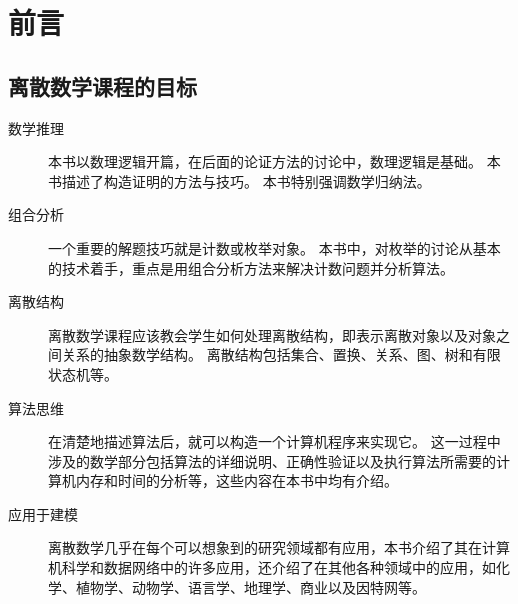 \chapter{前言}
{
    \section{离散数学课程的目标}
    {
        \begin{description}
            \item[数学推理]
            {
                本书以数理逻辑开篇，在后面的论证方法的讨论中，数理逻辑是基础。
                本书描述了构造证明的方法与技巧。
                本书特别强调数学归纳法。
            }
            \item[组合分析]
            {
                一个重要的解题技巧就是计数或枚举对象。
                本书中，对枚举的讨论从基本的技术着手，重点是用组合分析方法来解决计数问题并分析算法。
            }
            \item[离散结构]
            {
                离散数学课程应该教会学生如何处理离散结构，即表示离散对象以及对象之间关系的抽象数学结构。
                离散结构包括集合、置换、关系、图、树和有限状态机等。
            }
            \item[算法思维]
            {
                在清楚地描述算法后，就可以构造一个计算机程序来实现它。
                这一过程中涉及的数学部分包括算法的详细说明、正确性验证以及执行算法所需要的计算机内存和时间的分析等，这些内容在本书中均有介绍。
            }
            \item[应用于建模]
            {
                离散数学几乎在每个可以想象到的研究领域都有应用，本书介绍了其在计算机科学和数据网络中的许多应用，还介绍了在其他各种领域中的应用，如化学、植物学、动物学、语言学、地理学、商业以及因特网等。
            }
        \end{description}
    }
}


\cleardoublepage

\endinput
